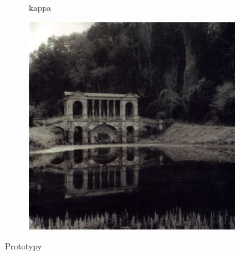 \documentclass[12pt]{article}
\begin{document}
\begin{figure}[h!]
\begin{subfigure}[b]{0.48\linewidth}
		\caption{kappa}
	\end{subfigure}
	\begin{subfigure}[b]{0.48\linewidth}
		\includegraphics[width=\linewidth]{zdj/morn.jpeg}
		\caption{}
	\end{subfigure}
	\label{fig:nuty}
	\caption{Prototypy}
\end{figure}
\end{document}
